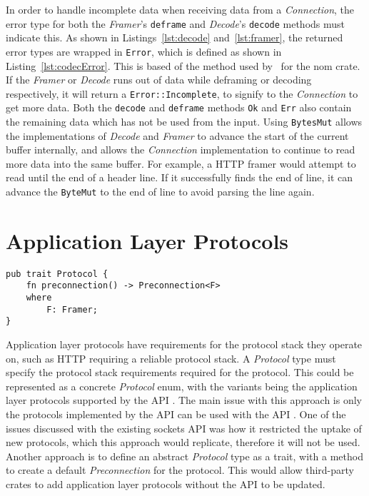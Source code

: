 In order to handle incomplete data when receiving data from a \emph{Connection}, the error type for both the
\emph{Framer}'s \texttt{deframe} and \emph{Decode}'s \texttt{decode} methods must indicate this.
As shown in Listings~\ref{lst:decode} and~\ref{lst:framer}, the returned error types are wrapped in \texttt{Error},
which is defined as shown in Listing~\ref{lst:codecError}.
This is based of the method used by~\cite{geal_nomerrrust_} for the nom crate.
If the \emph{Framer} or \emph{Decode} runs out of data while deframing or decoding respectively, it will return a
\texttt{Error::Incomplete}, to signify to the \emph{Connection} to get more data.
Both the \texttt{decode} and \texttt{deframe} methods \texttt{Ok} and \texttt{Err} also contain the remaining data which
has not be used from the input.
Using \texttt{BytesMut} allows the implementations of \emph{Decode} and \emph{Framer} to advance the start of the
current buffer internally, and allows the \emph{Connection} implementation to continue to read more data into the same
buffer.
For example, a HTTP framer would attempt to read until the end of a header line.
If it successfully finds the end of line, it can advance the \texttt{ByteMut} to the end of line to avoid parsing the
line again.

\section{Application Layer Protocols}\label{sec:application-layer-protocols}
\begin{lstlisting}[float=h, label=lst:protocol, caption={The Protocol trait.}]
pub trait Protocol {
    fn preconnection() -> Preconnection<F>
    where
        F: Framer;
}
\end{lstlisting}

Application layer protocols have requirements for the protocol stack they operate on, such as HTTP requiring a reliable
protocol stack.
A \emph{Protocol} type must specify the protocol stack requirements required for the protocol.
This could be represented as a concrete \emph{Protocol} enum, with the variants being the application layer protocols
supported by the API .
The main issue with this approach is only the protocols implemented by the API can be used with the API .
One of the issues discussed with the existing sockets API was how it restricted the uptake of new protocols, which this
approach would replicate, therefore it will not be used.
Another approach is to define an abstract \emph{Protocol} type as a trait, with a method to create a default
\emph{Preconnection} for the protocol.
This would allow third-party crates to add application layer protocols without the API to be updated.

